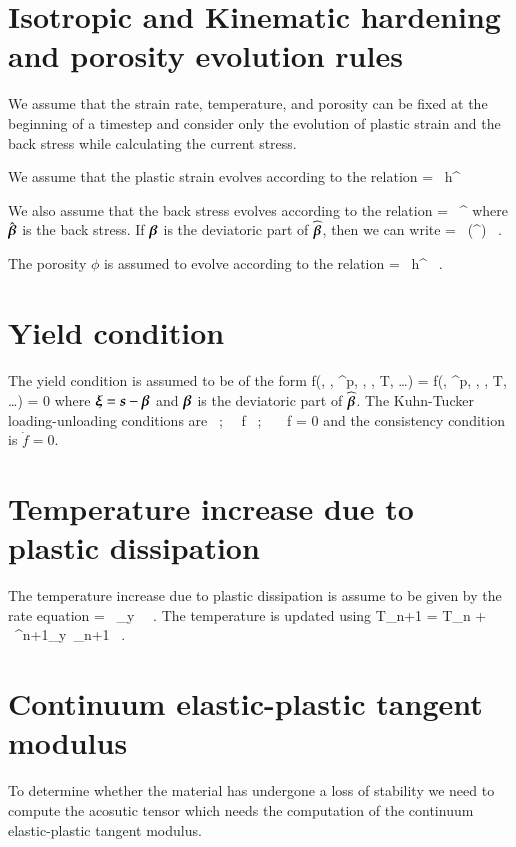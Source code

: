 \section{Isotropic and Kinematic hardening and porosity evolution rules}
We assume that the strain rate, temperature, and porosity can be fixed at the
beginning of a timestep and consider only the evolution of plastic strain and
the back stress while calculating the current stress.

We assume that the plastic strain evolves according to the relation
\Beq
   = \dot{\gamma}~h^{\alpha}
\Eeq

We also assume that the back stress evolves according to the relation
\Beq
  \dot{\widehat{\Bbeta}} = \dot{\gamma}~\Bh^{\beta}
\Eeq
where $\hat{\boldsymbol{\beta}}$ is the back stress.  If $\boldsymbol{\beta}$ is the deviatoric part of
$\widehat{\boldsymbol{\beta}}$, then we can write
\Beq
  \dot{\Bbeta} = \dot{\gamma}~\Dev(\Bh^{\beta}) ~.
\Eeq

The porosity $\phi$ is assumed to evolve according to the relation
\Beq
  \dot{\phi} = \dot{\gamma}~h^{\phi} ~.
\Eeq

\section{Yield condition}
The yield condition is assumed to be of the form
\Beq
  f(\Bs, \Bbeta, \Ve^p, \phi, \dot{\Ve}, T, \dots) 
    = f(\Bxi, \Ve^p, \phi, \dot{\Ve}, T, \dots) = 0
\Eeq
where $\boldsymbol{\xi} = \boldsymbol{s} - \boldsymbol{\beta}$ and $\boldsymbol{\beta}$ is the deviatoric part of $\widehat{\boldsymbol{\beta}}$.  
The Kuhn-Tucker loading-unloading conditions are
\Beq
  \dot{\gamma}  ~;~~  f  ~;~~ \dot{\gamma}~f = 0
\Eeq
and the consistency condition is $\dot{f} = 0$.

\section{Temperature increase due to plastic dissipation}
The temperature increase due to plastic dissipation is assume to be
given by the rate equation
\Beq
   = ~\sigma_y~ ~.
\Eeq
The temperature is updated using
\Beq
  T_{n+1} = T_n + 
   ~\sigma^{n+1}_y~_{n+1} ~.
\Eeq

\section{Continuum elastic-plastic tangent modulus}
To determine whether the material has undergone a loss of stability we need to compute
the acosutic tensor which needs the computation of the continuum elastic-plastic tangent
modulus.


